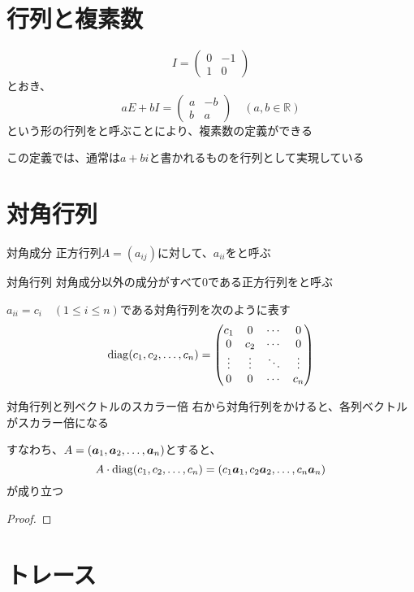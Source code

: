 \documentclass[../../../topic_linear-map]{subfiles}
\begin{document}
\sectionline
\section{行列と複素数}

\begin{equation*}
  I = \begin{pmatrix}
    0 & -1 \\
    1 & 0
  \end{pmatrix}
\end{equation*}
とおき、
\begin{equation*}
  aE + bI = \begin{pmatrix}
    a & -b \\
    b & a
  \end{pmatrix} \quad (a, b \in \mathbb{R})
\end{equation*}
という形の行列をと呼ぶことにより、複素数の定義ができる

この定義では、通常は$a + bi$と書かれるものを行列として実現している

\sectionline
\section{対角行列}

\begin{definition}{対角成分}
  正方行列$A = (a_{ij})$に対して、$a_{ii}$をと呼ぶ
\end{definition}

\begin{definition}{対角行列}
  対角成分以外の成分がすべて0である正方行列をと呼ぶ

  $a_{ii} = c_i \quad (1 \leq i \leq n)$である対角行列を次のように表す
  \begin{equation*}
    \operatorname{diag}(c_1, c_2, \ldots, c_n) = \begin{pmatrix}
      c_1    & 0      & \cdots & 0      \\
      0      & c_2    & \cdots & 0      \\
      \vdots & \vdots & \ddots & \vdots \\
      0      & 0      & \cdots & c_n
    \end{pmatrix}
  \end{equation*}
\end{definition}

\begin{theorem}{対角行列と列ベクトルのスカラー倍}
  右から対角行列をかけると、各列ベクトルがスカラー倍になる

  すなわち、$A = (\vb*{a}_1, \vb*{a}_2, \ldots, \vb*{a}_n)$とすると、
  \begin{equation*}
    A \cdot \operatorname{diag}(c_1, c_2, \ldots, c_n) = (c_1\vb*{a}_1, c_2\vb*{a}_2, \ldots, c_n\vb*{a}_n)
  \end{equation*}
  が成り立つ
\end{theorem}

\begin{proof}
\end{proof}

\sectionline
\section{トレース}

\end{document}
